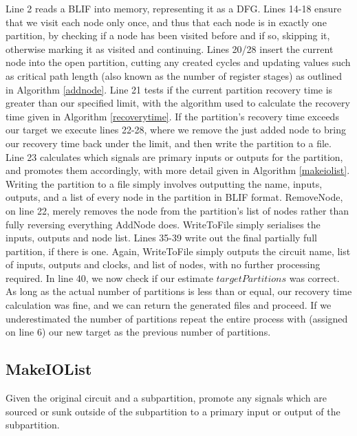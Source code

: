 \documentclass[12pt,final,oneside,a4paper]{dwThesis} %
\begin{document}
   \FloatBarrier
   Line 2 reads a \gls{BLIF} into memory, representing it as a \gls{DFG}.
   Lines 14-18 ensure that we visit each node only once, and thus that each node is
   in exactly one partition, by checking if a node has been visited before and
   if so, skipping it, otherwise marking it as visited and continuing.  Lines
   20/28 insert the current node into the open partition, cutting any created
   cycles and updating values such as critical path length (also known as the number of register stages)
   as outlined in
   Algorithm \ref{addnode}.  Line 21 tests if the current partition recovery
   time is greater than our specified limit, with the algorithm used to
   calculate the recovery time given in Algorithm \ref{recoverytime}.  If the
   partition's recovery time exceeds our target we execute lines 22-28, where
   we remove the just added node to bring our recovery time back under the
   limit, and then write the partition to a file.  Line 23 calculates which
   signals are primary inputs or outputs for the partition, and promotes them
   accordingly, with more detail given in Algorithm \ref{makeiolist}.  Writing
   the partition to a file simply involves outputting the name, inputs,
   outputs, and a list of every node in the partition in \gls{BLIF} format.
   RemoveNode, on line 22, merely removes the node from the partition's list of
   nodes rather than fully reversing everything AddNode does. WriteToFile
   simply serialises the inputs, outputs and node list.  Lines 35-39 write out
   the final partially full partition, if there is one. Again, WriteToFile
   simply outputs the circuit name, list of inputs, outputs and clocks, and
   list of nodes, with no further processing required.
   In line 40, we now check if our estimate $targetPartitions$ was correct. As long as the actual number of partitions is less than or equal, our recovery time
   calculation was fine, and we can return the generated files and proceed.
   If we underestimated the number of partitions repeat the entire process with (assigned on line 6) our new target as the previous number of partitions.


   \newpage 
   \subsection{MakeIOList}
   Given the original circuit and a
   subpartition, promote any signals which are sourced or sunk outside of the
   subpartition to a primary input or output of the subpartition.
\end{document}
